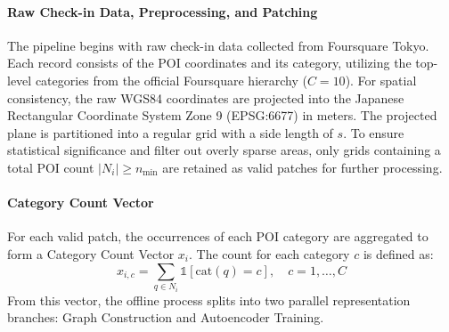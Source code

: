 \documentclass[sigconf]{acmart}
\begin{document}
\paragraph{Raw Check-in Data, Preprocessing, and Patching}
The pipeline begins with raw check-in data collected from Foursquare Tokyo. Each record consists of the POI coordinates and its category, utilizing the top-level categories from the official Foursquare hierarchy ($C=10$). For spatial consistency, the raw WGS84 coordinates are projected into the Japanese Rectangular Coordinate System Zone 9 (EPSG:6677) in meters. The projected plane is partitioned into a regular grid with a side length of $s$. To ensure statistical significance and filter out overly sparse areas, only grids containing a total POI count $|N_i| \ge n_{\min}$ are retained as valid patches for further processing.

\paragraph{Category Count Vector}
For each valid patch, the occurrences of each POI category are aggregated to form a Category Count Vector $x_i$. The count for each category $c$ is defined as:
\begin{equation}
x_{i,c}=\sum_{q\in N_i}\mathbb{1}[\text{cat}(q)=c],\quad c=1,\dots,C
\end{equation}
From this vector, the offline process splits into two parallel representation branches: Graph Construction and Autoencoder Training.
\end{document}
